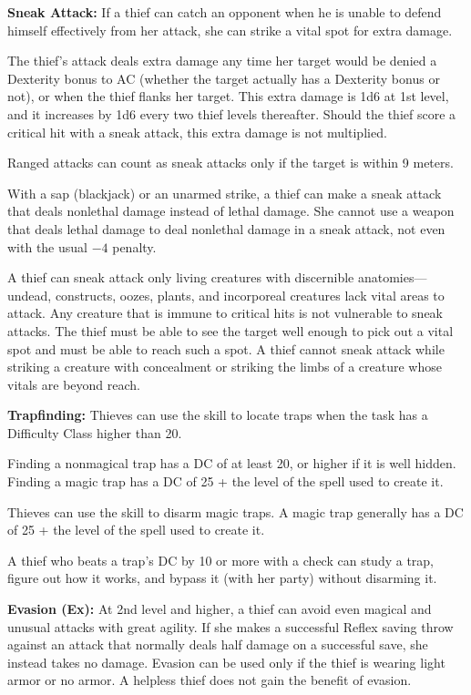 \textbf{Sneak Attack:} If a thief can catch an opponent when he is unable to defend himself effectively from her attack, she can strike a vital spot for extra damage.

The thief's attack deals extra damage any time her target would be denied a Dexterity bonus to AC (whether the target actually has a Dexterity bonus or not), or when the thief flanks her target. This extra damage is 1d6 at 1st level, and it increases by 1d6 every two thief levels thereafter. Should the thief score a critical hit with a sneak attack, this extra damage is not multiplied.

Ranged attacks can count as sneak attacks only if the target is within 9 meters.

With a sap (blackjack) or an unarmed strike, a thief can make a sneak attack that deals nonlethal damage instead of lethal damage. She cannot use a weapon that deals lethal damage to deal nonlethal damage in a sneak attack, not even with the usual $-4$ penalty.

A thief can sneak attack only living creatures with discernible anatomies---undead, constructs, oozes, plants, and incorporeal creatures lack vital areas to attack. Any creature that is immune to critical hits is not vulnerable to sneak attacks. The thief must be able to see the target well enough to pick out a vital spot and must be able to reach such a spot. A thief cannot sneak attack while striking a creature with concealment or striking the limbs of a creature whose vitals are beyond reach.

\textbf{Trapfinding:} Thieves can use the  skill to locate traps when the task has a Difficulty Class higher than 20.

Finding a nonmagical trap has a DC of at least 20, or higher if it is well hidden. Finding a magic trap has a DC of 25 + the level of the spell used to create it.

Thieves can use the  skill to disarm magic traps. A magic trap generally has a DC of 25 + the level of the spell used to create it.

A thief who beats a trap's DC by 10 or more with a  check can study a trap, figure out how it works, and bypass it (with her party) without disarming it.

\textbf{Evasion (Ex):} At 2nd level and higher, a thief can avoid even magical and unusual attacks with great agility. If she makes a successful Reflex saving throw against an attack that normally deals half damage on a successful save, she instead takes no damage. Evasion can be used only if the thief is wearing light armor or no armor. A helpless thief does not gain the benefit of evasion.


